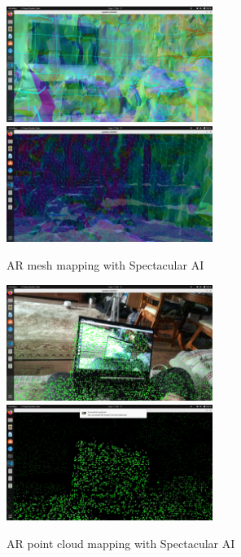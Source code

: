 \begin{figure}[htbp]
	\centering
	\includegraphics[width=67mm, keepaspectratio]{figures/spectacular_ai_mapping_ar_mesh1.png}\hspace{1cm}
	\includegraphics[width=67mm, keepaspectratio]{figures/spectacular_ai_mapping_ar_mesh2.png}\\\vspace{5mm}
	\caption{AR mesh mapping with Spectacular AI}
    \label{fig:SPAI_mesh_mapping}
\end{figure}

\begin{figure}[htbp]
	\centering
	\includegraphics[width=67mm, keepaspectratio]{figures/spectacular_ai_mapping_ar_pc1.png}\hspace{1cm}
	\includegraphics[width=67mm, keepaspectratio]{figures/spectacular_ai_mapping_ar_pc2.png}\\\vspace{5mm}
	\caption{AR point cloud mapping with Spectacular AI}
    \label{fig:SPAI_point_cloud_mapping}
\end{figure}

